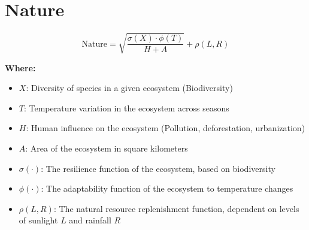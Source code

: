 \chapter{Nature}

\begin{equation}
\text{Nature} = \sqrt{\frac{\sigma(X) \cdot \phi(T)}{H + A}} + \rho(L, R)
\end{equation}

\textbf{Where:}

\begin{itemize}
    \item $X$: Diversity of species in a given ecosystem (Biodiversity)
    \item $T$: Temperature variation in the ecosystem across seasons
    \item $H$: Human influence on the ecosystem (Pollution, deforestation, urbanization)
    \item $A$: Area of the ecosystem in square kilometers
    \item $\sigma(\cdot)$: The resilience function of the ecosystem, based on biodiversity
    \item $\phi(\cdot)$: The adaptability function of the ecosystem to temperature changes
    \item $\rho(L, R)$: The natural resource replenishment function, dependent on levels of sunlight $L$ and rainfall $R$
\end{itemize}